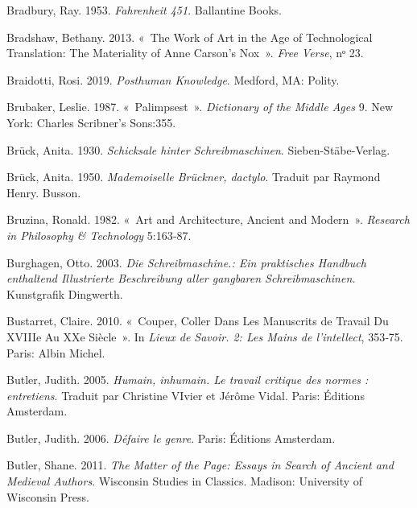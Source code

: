 \begin{CSLReferences}{1}{0}
\leavevmode{}%
Bradbury, Ray. 1953. \emph{Fahrenheit 451}. {Ballantine Books}.

\leavevmode{}%
Bradshaw, Bethany. 2013. {«~The {Work} of {Art} in the {Age} of
{Technological Translation}: {The Materiality} of {Anne Carson}'s
{Nox}~»}. \emph{Free Verse}, nᵒ 23.

\leavevmode{}%
Braidotti, Rosi. 2019. \emph{Posthuman {Knowledge}}. {Medford, MA}:
{Polity}.

\leavevmode{}%
Brubaker, Leslie. 1987. {«~Palimpsest~»}. \emph{Dictionary of the Middle
Ages} 9. {New York}: {Charles Scribner's Sons}:355.

\leavevmode{}%
Brück, Anita. 1930. \emph{{Schicksale hinter Schreibmaschinen}}.
{Sieben-St{ä}be-Verlag}.

\leavevmode{}%
Brück, Anita. 1950. \emph{{Mademoiselle Br{ü}ckner, dactylo}}. Traduit
par Raymond Henry. {Busson}.

\leavevmode{}%
Bruzina, Ronald. 1982. {«~Art and {Architecture}, {Ancient} and
{Modern}~»}. \emph{Research in Philosophy \& Technology} 5:163‑87.

\leavevmode{}%
Burghagen, Otto. 2003. \emph{{Die Schreibmaschine.: Ein praktisches
Handbuch enthaltend Illustrierte Beschreibung aller gangbaren
Schreibmaschinen.}} {Kunstgrafik Dingwerth}.

\leavevmode{}%
Bustarret, Claire. 2010. {«~Couper, Coller Dans Les Manuscrits de
Travail Du {XVIIIe} Au {XXe} Si{è}cle~»}. In \emph{Lieux de Savoir. 2:
Les Mains de l'intellect}, 353‑75. {Paris}: {Albin Michel}.

\leavevmode{}%
Butler, Judith. 2005. \emph{{Humain, inhumain. Le travail critique des
normes : entretiens}}. Traduit par Christine VIvier et Jérôme Vidal.
{Paris}: {{É}ditions Amsterdam}.

\leavevmode{}%
Butler, Judith. 2006. \emph{{D{é}faire le genre}}. {Paris}: {{É}ditions
Amsterdam}.

\leavevmode{}%
Butler, Shane. 2011. \emph{The {Matter} of the {Page}: {Essays} in
{Search} of {Ancient} and {Medieval Authors}}. Wisconsin Studies in
Classics. {Madison}: {University of Wisconsin Press}.


\end{CSLReferences}
